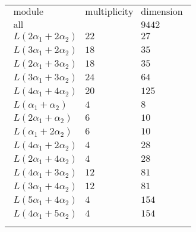 \documentclass[crop,border=2mm]{standalone}
\begin{document}
\begin{tabular}{l}
$\displaystyle
\begin{array}{rll}
	\text{module}&\text{multiplicity}&\text{dimension} \\ \hline \text{all}&&9442 \\
	L\left( 2\alpha_{1}+ 2\alpha_{2}\right)&22&27\\
	L\left( 3\alpha_{1}+ 2\alpha_{2}\right)&18&35\\
	L\left( 2\alpha_{1}+ 3\alpha_{2}\right)&18&35\\
	L\left( 3\alpha_{1}+ 3\alpha_{2}\right)&24&64\\
	L\left( 4\alpha_{1}+ 4\alpha_{2}\right)&20&125\\
	L\left(\alpha_{1}+\alpha_{2}\right)&4&8\\
	L\left( 2\alpha_{1}+\alpha_{2}\right)&6&10\\
	L\left(\alpha_{1}+ 2\alpha_{2}\right)&6&10\\
	L\left( 4\alpha_{1}+ 2\alpha_{2}\right)&4&28\\
	L\left( 2\alpha_{1}+ 4\alpha_{2}\right)&4&28\\
	L\left( 4\alpha_{1}+ 3\alpha_{2}\right)&12&81\\
	L\left( 3\alpha_{1}+ 4\alpha_{2}\right)&12&81\\
	L\left( 5\alpha_{1}+ 4\alpha_{2}\right)&4&154\\
	L\left( 4\alpha_{1}+ 5\alpha_{2}\right)&4&154
\end{array}
$ \\ \\

\end{tabular}
\end{document}
